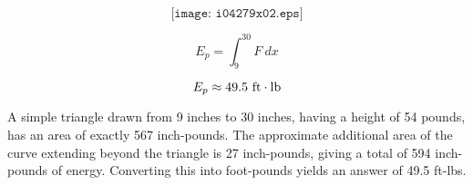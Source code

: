 $$\texttt{[image: i04279x02.eps]}$$

$$E_p = \int_9^{30} F \> dx$$

$$E_p \approx 49.5 \hbox{ ft} \cdot \hbox{lb}$$

A simple triangle drawn from 9 inches to 30 inches, having a height of 54 pounds, has an area of exactly 567 inch-pounds.  The approximate additional area of the curve extending beyond the triangle is 27 inch-pounds, giving a total of 594 inch-pounds of energy.  Converting this into foot-pounds yields an answer of 49.5 ft-lbs.




